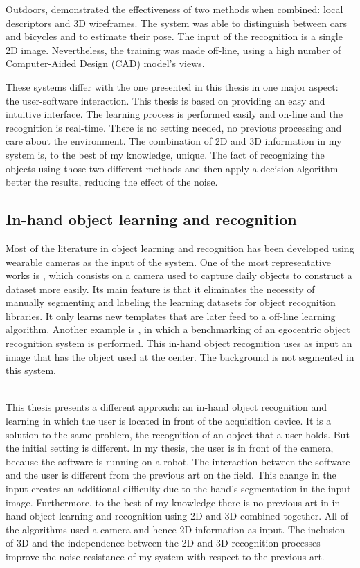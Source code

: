 Outdoors, \cite{Zia2013} demonstrated the effectiveness of two methods when combined: local descriptors and 3D wireframes. 
The system was able to distinguish between cars and bicycles and to estimate their pose. 
The input of the recognition is a single 2D image. 
Nevertheless, the training was made off-line, using a high number of Computer-Aided Design (CAD) model's views. 

These systems differ with the one presented in this thesis in one major aspect: 
the user-software interaction. 
This thesis is based on providing an easy and intuitive interface. 
The learning process is performed easily and on-line and the recognition is real-time. 
There is no setting needed, no previous processing and care about the environment. 
The combination of 2D and 3D information in my system is, to the best of my knowledge, unique. 
The fact of recognizing the objects using those two different methods and then apply a decision algorithm better the results, reducing the effect of the noise.  



\subsection{In-hand object learning and recognition}

Most of the literature in object learning and recognition has been developed using wearable cameras as the input of the system. 
One of the most representative works is \cite{Roth2006}, which consists on a camera used to capture daily objects to construct a dataset more easily. 
Its main feature is that it eliminates the necessity of manually segmenting and labeling the learning datasets for object recognition libraries. 
It only learns new templates that are later feed to a off-line learning algorithm. 
Another example is \cite{Philipose2009}, in which a benchmarking of an egocentric object recognition system is performed. 
This in-hand object recognition uses as input an image that has the object used at the center. 
The background is not segmented in this system. 

\\

This thesis presents a different approach: an in-hand object recognition and learning in which the user is located in front of the acquisition device. 
It is a solution to the same problem, the recognition of an object that a user holds. 
But the initial setting is different. 
In my thesis, the user is in front of the camera, because the software is running on a robot. 
The interaction between the software and the user is different from the previous art on the field. 
This change in the input creates an additional difficulty due to the hand's segmentation in the input image. 
Furthermore, to the best of my knowledge there is no previous art in in-hand object learning and recognition using 2D and 3D combined together. 
All of the algorithms used a camera and hence 2D information as input. 
The inclusion of 3D and the independence between the 2D and 3D recognition processes improve the noise resistance of my system with respect to the previous art. 


